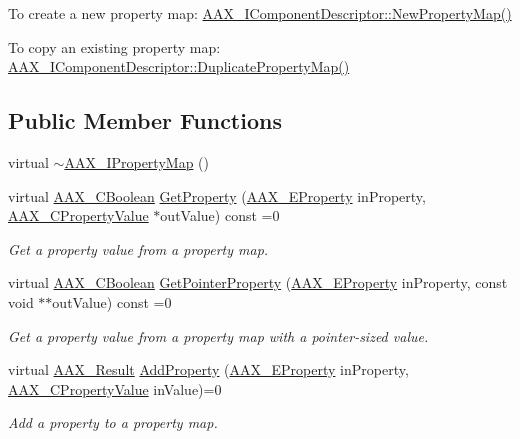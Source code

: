 \begin{DoxyItemize}
\item To create a new property map\+: \hyperlink{a00088_a0d7dd21daa8bc588d6a1145c3eb7ef98}{A\+A\+X\+\_\+\+I\+Component\+Descriptor\+::\+New\+Property\+Map()}
\item To copy an existing property map\+: \hyperlink{a00088_a107f2d11ba9165ef84162a76368f6ee6}{A\+A\+X\+\_\+\+I\+Component\+Descriptor\+::\+Duplicate\+Property\+Map()} 
\end{DoxyItemize}\subsection*{Public Member Functions}
\begin{DoxyCompactItemize}
\item 
virtual \hyperlink{a00112_af8a29fbaf587471266dee3968be0b698}{$\sim$\+A\+A\+X\+\_\+\+I\+Property\+Map} ()
\item 
virtual \hyperlink{a00149_aa216506530f1d19a2965931ced2b274b}{A\+A\+X\+\_\+\+C\+Boolean} \hyperlink{a00112_a451fcba9a3223f6686a8adb125d134bf}{Get\+Property} (\hyperlink{a00283_a6571f4e41a5dd06e4067249228e2249e}{A\+A\+X\+\_\+\+E\+Property} in\+Property, \hyperlink{a00149_ab247c0d8686c14e05cbb567ef276f249}{A\+A\+X\+\_\+\+C\+Property\+Value} $\ast$out\+Value) const =0
\begin{DoxyCompactList}\small\item\em Get a property value from a property map. \end{DoxyCompactList}\item 
virtual \hyperlink{a00149_aa216506530f1d19a2965931ced2b274b}{A\+A\+X\+\_\+\+C\+Boolean} \hyperlink{a00112_a3990a31fd831975a2ff410213593ebef}{Get\+Pointer\+Property} (\hyperlink{a00283_a6571f4e41a5dd06e4067249228e2249e}{A\+A\+X\+\_\+\+E\+Property} in\+Property, const void $\ast$$\ast$out\+Value) const =0
\begin{DoxyCompactList}\small\item\em Get a property value from a property map with a pointer-\/sized value. \end{DoxyCompactList}\item 
virtual \hyperlink{a00149_a4d8f69a697df7f70c3a8e9b8ee130d2f}{A\+A\+X\+\_\+\+Result} \hyperlink{a00112_a0997671afce9a2367662c764c1d055dd}{Add\+Property} (\hyperlink{a00283_a6571f4e41a5dd06e4067249228e2249e}{A\+A\+X\+\_\+\+E\+Property} in\+Property, \hyperlink{a00149_ab247c0d8686c14e05cbb567ef276f249}{A\+A\+X\+\_\+\+C\+Property\+Value} in\+Value)=0
\begin{DoxyCompactList}\small\item\em Add a property to a property map. \end{DoxyCompactList}\item 
$$
\end{DoxyCompactItemize}
